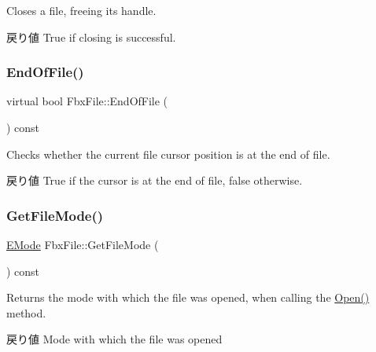 Closes a file, freeing its handle. \begin{DoxyReturn}{戻り値}
True if closing is successful. 
\end{DoxyReturn}
\mbox{\label{class_fbx_file_a3e438294b7e07dbc3b672ba771ebdd51}} 
\subsubsection{\texorpdfstring{End\+Of\+File()}{EndOfFile()}}
{\footnotesize\ttfamily virtual bool Fbx\+File\+::\+End\+Of\+File (\begin{DoxyParamCaption}{ }\end{DoxyParamCaption}) const\hspace{0.3cm}{\ttfamily [virtual]}}

Checks whether the current file cursor position is at the end of file. \begin{DoxyReturn}{戻り値}
True if the cursor is at the end of file, false otherwise. 
\end{DoxyReturn}
\mbox{\label{class_fbx_file_a26175571d3f5682ea7af8ac5ba1f640f}} 
\subsubsection{\texorpdfstring{Get\+File\+Mode()}{GetFileMode()}}
{\footnotesize\ttfamily \hyperlink{class_fbx_file_a0370e8fd17b3658f718e1350a6a6f462}{E\+Mode} Fbx\+File\+::\+Get\+File\+Mode (\begin{DoxyParamCaption}{ }\end{DoxyParamCaption}) const}

Returns the mode with which the file was opened, when calling the \hyperlink{class_fbx_file_a1942c2245eabf7f0507118226af13727}{Open()} method. \begin{DoxyReturn}{戻り値}
Mode with which the file was opened 
\end{DoxyReturn}
\mbox{\label{class_fbx_file_ace17e0fc453b1fa2f565af58eb16ad26}} 
